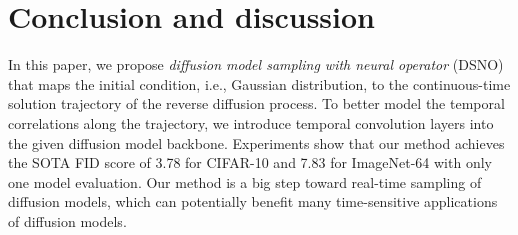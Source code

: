 
\section{Conclusion and discussion}
In this paper, we propose \textit{diffusion model sampling with neural operator} (DSNO) that maps the initial condition, i.e., Gaussian distribution, to the continuous-time solution trajectory of the reverse diffusion process. To better model the temporal correlations along the trajectory, we introduce temporal convolution layers into the given diffusion model backbone.  Experiments show that our method achieves the SOTA FID score of 3.78 for CIFAR-10 and 7.83 for ImageNet-64 with only one model evaluation. 
Our method is a big step toward real-time sampling of diffusion models, which can potentially benefit many time-sensitive applications of diffusion models. 

